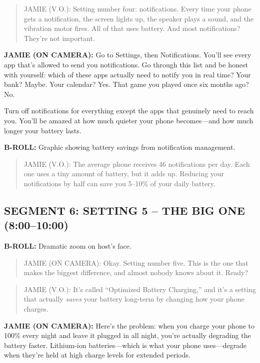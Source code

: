 \documentclass[
    language=english,
    doctype=video-script,
    institution=none,
]{../../omnilatex}
\begin{document}
\begin{quote}
JAMIE (V.O.): Setting number four: notifications. Every time your phone gets a notification, the screen lights up, the speaker plays a sound, and the vibration motor fires. All of that uses battery. And most notifications? They're not important.
\end{quote}

\textbf{JAMIE (ON CAMERA):} Go to Settings, then Notifications. You'll see every app that's allowed to send you notifications. Go through this list and be honest with yourself: which of these apps actually need to notify you in real time? Your bank? Maybe. Your calendar? Yes. That game you played once six months ago? No.

Turn off notifications for everything except the apps that genuinely need to reach you. You'll be amazed at how much quieter your phone becomes---and how much longer your battery lasts.

\textbf{B-ROLL:} Graphic showing battery savings from notification management.

\begin{quote}
JAMIE (V.O.): The average phone receives 46 notifications per day. Each one uses a tiny amount of battery, but it adds up. Reducing your notifications by half can save you 5--10\% of your daily battery.
\end{quote}

\subsection*{SEGMENT 6: SETTING 5 -- THE BIG ONE (8:00--10:00)}

\textbf{B-ROLL:} Dramatic zoom on host's face.

\begin{quote}
JAMIE (ON CAMERA): Okay. Setting number five. This is the one that makes the biggest difference, and almost nobody knows about it. Ready?
\end{quote}

\begin{quote}
JAMIE (V.O.): It's called ``Optimized Battery Charging,'' and it's a setting that actually \textit{saves} your battery long-term by changing how your phone charges.
\end{quote}

\textbf{JAMIE (ON CAMERA):} Here's the problem: when you charge your phone to 100\% every night and leave it plugged in all night, you're actually degrading the battery faster. Lithium-ion batteries---which is what your phone uses---degrade when they're held at high charge levels for extended periods.
\end{document}
